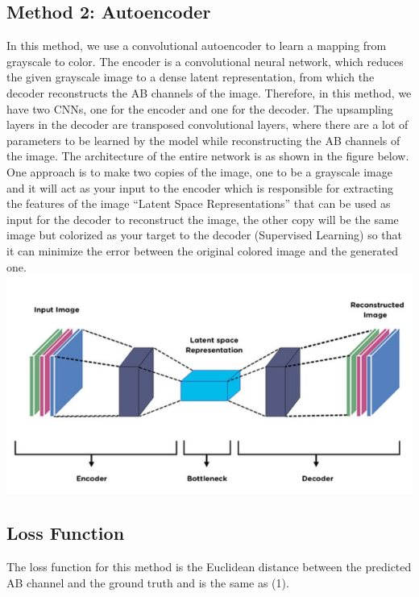 \documentclass{article}
\begin{document}
\subsection{Method 2: Autoencoder}
In this method, we use a convolutional autoencoder to learn a mapping from grayscale to color.
The encoder is a convolutional neural network, which reduces the given grayscale image to a dense latent representation, from which the decoder reconstructs the AB channels of the image.
Therefore, in this method, we have two CNNs, one for the encoder and one for the decoder.
The upsampling layers in the decoder are transposed convolutional layers, where there are a lot of parameters to be learned by the model while reconstructing the AB channels of the image.
The architecture of the entire network is as shown in the figure below. 
One approach is to make two copies of the image, one to be a grayscale image and it will act as your input to the encoder which is responsible for extracting the features of the image 
“Latent Space Representations” that can be used as input for the decoder to reconstruct the image, the other copy will be the same image but colorized as your target to the decoder (Supervised Learning) so that it can minimize the error between the original colored image and the generated one.
\\
\includegraphics{autoencoder.jpg}


\subsection{Loss Function}
The loss function for this method is the Euclidean distance between the predicted AB channel and the ground truth and is the same as (1).
\end{document}
